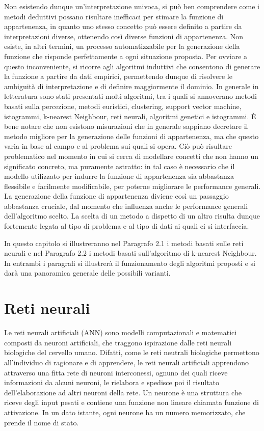 \documentclass[11pt,  oneside, openany]{book}
\begin{document}
Non esistendo dunque un'interpretazione univoca, si può ben comprendere come i metodi deduttivi possano risultare inefficaci per stimare la funzione di appartenenza, in quanto uno stesso concetto può essere definito a partire da interpretazioni diverse, ottenendo così diverse funzioni di appartenenza. Non esiste, in altri termini, un processo automatizzabile per la generazione della funzione che risponde perfettamente a ogni situazione proposta. Per ovviare a questo inconveniente, si ricorre agli algoritmi induttivi che consentono di generare la funzione a partire da dati empirici, permettendo dunque di risolvere le ambiguità di interpretazione e di definire maggiormente il dominio. In generale in letteratura sono stati presentati molti algoritmi, tra i quali si annoverano metodi basati sulla percezione, metodi euristici, clustering, support vector machine, istogrammi, k-nearest Neighbour, reti neurali, algoritmi genetici e istogrammi. 
\`E bene notare che non esistono misurazioni che in generale sappiano decretare il metodo migliore per la generazione delle funzioni di appartenenza, ma che questo varia in base al campo e al problema sui quali si opera. Ciò può risultare problematico nel momento in cui si cerca di modellare concetti che non hanno un significato concreto, ma puramente astratto: in tal caso è necessario che il modello utilizzato per indurre la funzione di appartenenza sia abbastanza flessibile e facilmente modificabile, per poterne migliorare le performance generali. La generazione della funzione di appartenenza diviene così un passaggio abbastanza cruciale, dal momento che influenza anche le performance generali dell'algoritmo scelto. La scelta di un metodo a dispetto di un altro risulta dunque fortemente legata al tipo di problema e al tipo di dati ai quali ci si interfaccia. 

In questo capitolo si illustreranno nel Paragrafo 2.1 i metodi basati sulle reti neurali e nel Paragrafo 2.2 i metodi basati sull'algoritmo di k-nearest Neighbour. In entrambi i paragrafi si illustrerà il funzionamento degli algoritmi proposti e si darà una panoramica generale delle possibili varianti. 


	\section{Reti neurali}

Le reti neurali artificiali (ANN) sono modelli computazionali e matematici composti da neuroni artificiali, che traggono ispirazione dalle reti neurali biologiche del cervello umano. Difatti, come le reti neutrali biologiche permettono all'individuo di ragionare e di apprendere, le reti neurali artificiali apprendono attraverso una fitta rete di neuroni interconessi, ognuno dei quali riceve informazioni da alcuni neuroni, le rielabora e spedisce poi il risultato dell'elaborazione ad altri neuroni della rete. Un neurone è una struttura che riceve degli input pesati e contiene una funzione non lineare chiamata funzione di attivazione. In un dato istante, ogni neurone ha un numero memorizzato, che prende il nome di stato. 
\end{document}
